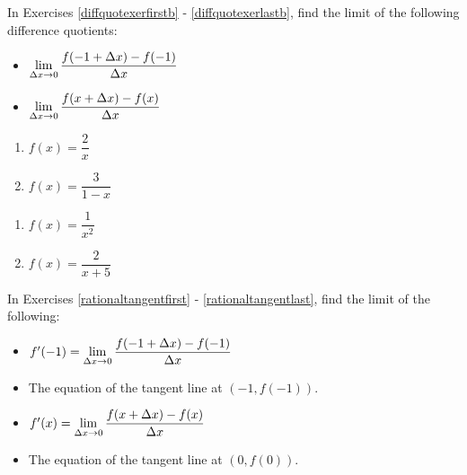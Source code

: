 In Exercises \ref{diffquotexerfirstb} - \ref{diffquotexerlastb}, find the limit of the following difference quotients:

\begin{multicols}{2}

\begin{itemize}

\item  $\displaystyle{\lim_{\Delta x \rightarrow 0} \dfrac{f(-1+\Delta x) - f(-1)}{\Delta x}}$

\item  $\displaystyle{\lim_{\Delta x \rightarrow 0} \dfrac{f(x+\Delta x) - f(x)}{\Delta x}}$

\end{itemize}

\end{multicols}

\begin{multicols}{2}
\begin{enumerate}
\setcounter{enumi}{\value{HW}}

\item $f(x) = \dfrac{2}{x}$  \label{diffquotexerfirstb}
\item $f(x) = \dfrac{3}{1-x}$

\setcounter{HW}{\value{enumi}}
\end{enumerate}
\end{multicols}

\begin{multicols}{2}
\begin{enumerate}
\setcounter{enumi}{\value{HW}}

\item  $f(x) = \dfrac{1}{x^2}$
\item\label{diffquotexerlastb}  $f(x) = \dfrac{2}{x+5}$

\setcounter{HW}{\value{enumi}}
\end{enumerate}
\end{multicols}

In Exercises \ref{rationaltangentfirst} - \ref{rationaltangentlast}, find the limit of the following:



\begin{itemize}

\item  $f'(-1) = \displaystyle{\lim_{\Delta x \rightarrow 0} \dfrac{f(-1+\Delta x) - f(-1)}{\Delta x}}$

\item The equation of the tangent line at $(-1, f(-1))$.

\item  $f'(x) = \displaystyle{\lim_{\Delta x \rightarrow 0} \dfrac{f(x+\Delta x) - f(x)}{\Delta x}}$

\item  The equation of the tangent line at $(0,f(0))$.

\end{itemize}

